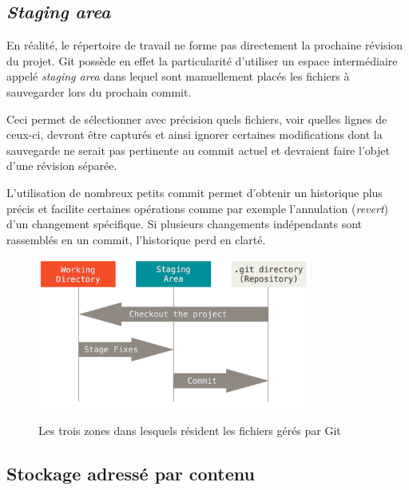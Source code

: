 \documentclass[11pt,a4paper]{article}
\begin{document}
\subsection{\textit{Staging area}}

En réalité, le répertoire de travail ne forme pas directement la prochaine révision du projet.
Git possède en effet la particularité d'utiliser un espace intermédiaire appelé \textit{staging area} dans lequel sont manuellement placés les fichiers à sauvegarder lors du prochain commit. 

Ceci permet de sélectionner avec précision quels fichiers, voir quelles lignes de ceux-ci, devront être capturés et ainsi ignorer certaines modifications dont la sauvegarde ne serait pas pertinente au commit actuel et devraient faire l'objet d'une révision séparée.

L'utilisation de nombreux petits commit permet d'obtenir un historique plus précis et facilite certaines opérations comme par exemple l'annulation (\textit{revert}) d'un changement spécifique. Si plusieurs changements indépendants sont rassemblés en un commit, l'historique perd en clarté.


\begin{figure}[ht]
\begin{center}
\includegraphics[width=9cm]{img_areas} \cite{progit}
\caption{Les trois zones dans lesquels résident les fichiers gérés par Git}
\end{center}
\end{figure}

\vspace{-4mm}
\subsection{Stockage adressé par contenu}
\end{document}
